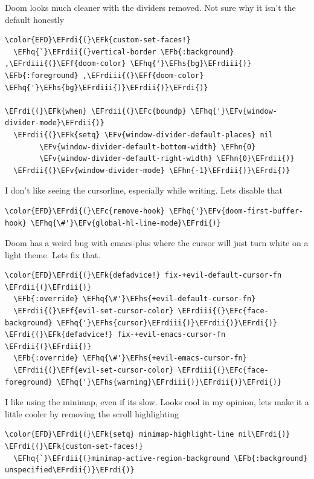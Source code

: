 \documentclass{scrartcl}
\newcommand{\EFk}[1]{\textcolor{EFk}{#1}} %
\newcommand{\EFb}[1]{\textcolor{EFb}{#1}} %
\newcommand{\EFc}[1]{\textcolor{EFc}{#1}} %
\newcommand{\EFv}[1]{\textcolor{EFv}{#1}} %
\newcommand{\EFf}[1]{\textcolor{EFf}{#1}} %
\newcommand{\EFhn}[1]{#1} %
\newcommand{\EFhq}[1]{#1} %
\newcommand{\EFhs}[1]{#1} %
\newcommand{\EFrdi}[1]{#1} %
\newcommand{\EFrdii}[1]{#1} %
\newcommand{\EFrdiii}[1]{#1} %
\begin{document}
Doom looks much cleaner with the dividers removed. Not sure why it isn't the default honestly
\begin{Code}
\begin{Verbatim}[]
\color{EFD}\EFrdi{(}\EFk{custom-set-faces!}
  \EFhq{`}\EFrdii{(}vertical-border \EFb{:background} ,\EFrdiii{(}\EFf{doom-color} \EFhq{'}\EFhs{bg}\EFrdiii{)} \EFb{:foreground} ,\EFrdiii{(}\EFf{doom-color} \EFhq{'}\EFhs{bg}\EFrdiii{)}\EFrdii{)}\EFrdi{)}

\EFrdi{(}\EFk{when} \EFrdii{(}\EFc{boundp} \EFhq{'}\EFv{window-divider-mode}\EFrdii{)}
  \EFrdii{(}\EFk{setq} \EFv{window-divider-default-places} nil
        \EFv{window-divider-default-bottom-width} \EFhn{0}
        \EFv{window-divider-default-right-width} \EFhn{0}\EFrdii{)}
  \EFrdii{(}\EFv{window-divider-mode} \EFhn{-1}\EFrdii{)}\EFrdi{)}
\end{Verbatim}
\end{Code}

I don't like seeing the cursorline, especially while writing. Lets disable that
\begin{Code}
\begin{Verbatim}[]
\color{EFD}\EFrdi{(}\EFc{remove-hook} \EFhq{'}\EFv{doom-first-buffer-hook} \EFhq{\#'}\EFv{global-hl-line-mode}\EFrdi{)}
\end{Verbatim}
\end{Code}

Doom has a weird bug with emacs-plus where the cursor will just turn white on a light theme. Lets fix that.
\begin{Code}
\begin{Verbatim}[]
\color{EFD}\EFrdi{(}\EFk{defadvice!} fix-+evil-default-cursor-fn \EFrdii{(}\EFrdii{)}
  \EFb{:override} \EFhq{\#'}\EFhs{+evil-default-cursor-fn}
  \EFrdii{(}\EFf{evil-set-cursor-color} \EFrdiii{(}\EFc{face-background} \EFhq{'}\EFhs{cursor}\EFrdiii{)}\EFrdii{)}\EFrdi{)}
\EFrdi{(}\EFk{defadvice!} fix-+evil-emacs-cursor-fn \EFrdii{(}\EFrdii{)}
  \EFb{:override} \EFhq{\#'}\EFhs{+evil-emacs-cursor-fn}
  \EFrdii{(}\EFf{evil-set-cursor-color} \EFrdiii{(}\EFc{face-foreground} \EFhq{'}\EFhs{warning}\EFrdiii{)}\EFrdii{)}\EFrdi{)}
\end{Verbatim}
\end{Code}

I like using the minimap, even if its slow. Looks cool in my opinion, lets make it a little cooler by removing the scroll highlighting
\begin{Code}
\begin{Verbatim}[]
\color{EFD}\EFrdi{(}\EFk{setq} minimap-highlight-line nil\EFrdi{)}
\EFrdi{(}\EFk{custom-set-faces!}
  \EFhq{`}\EFrdii{(}minimap-active-region-background \EFb{:background} unspecified\EFrdii{)}\EFrdi{)}
\end{Verbatim}
\end{Code}
\end{document}
